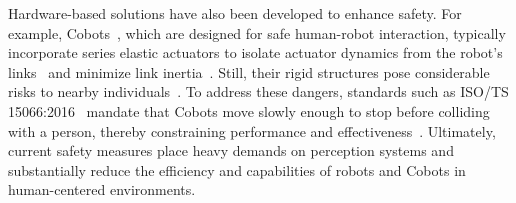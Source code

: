 Hardware-based solutions have also been developed to enhance safety. For example, \glspl{Cobot}~\citep{el2019cobot}, which are designed for safe human-robot interaction, typically incorporate series elastic actuators to isolate actuator dynamics from the robot’s links~\citep{pratt1995series} and minimize link inertia~\citep{albu2007dlr}. Still, their rigid structures pose considerable risks to nearby individuals~\citep{haddadin2013towards}. To address these dangers, standards such as ISO/TS 15066:2016~\citep{Isots_15066_2016} mandate that \glspl{Cobot} move slowly enough to stop before colliding with a person, thereby constraining performance and effectiveness~\citep{ajoudani2018progress, lucci2020combining}. Ultimately, current safety measures place heavy demands on perception systems and substantially reduce the efficiency and capabilities of robots and \glspl{Cobot} in human-centered environments.

